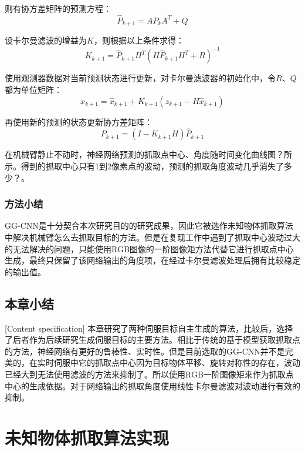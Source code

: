 \documentclass[fontset=fandol,type=bachelor,campus=harbin]{hithesisbook}
\begin{document}
则有协方差矩阵的预测方程：
\begin{equation}
\hat{P}_{k+1}=AP_kA^T+Q
\label{协方差预测}
\end{equation}


设卡尔曼滤波的增益为$K$，则根据以上条件求得：
\begin{equation}
K_{k+1}=\hat{P}_{k+1}H^T\left( H\hat{P}_{k+1}H^T+R \right) ^{-1}
\label{卡尔曼滤波的增益}
\end{equation}


使用观测器数据对当前预测状态进行更新，对卡尔曼滤波器的初始化中，令$R$、$Q$都为单位矩阵：
\begin{equation}
x_{k+1}=\hat{x}_{k+1}+K_{k+1}\left( z_{k+1}-H\hat{x}_{k+1} \right) 
\label{卡尔曼滤波的增益}
\end{equation}


再使用新的预测的状态更新协方差矩阵：
\begin{equation}
P_{k+1}=\left( I-K_{k+1}H \right) \hat{P}_{k+1}
\label{更新协方差矩阵}
\end{equation}


在机械臂静止不动时，神经网络预测的抓取点中心、角度随时间变化曲线{\color{red}图？所示}。得到的抓取中心只有1到2像素点的波动，预测的抓取角度波动几乎消失了{\color{red}多少？}。
\subsection{方法小结}
GG-CNN是十分契合本次研究目的的研究成果，因此它被选作未知物体抓取算法中解决机械臂怎么去抓取目标的方法。但是在复现工作中遇到了抓取中心波动过大的无法解决的问题，只能使用RGB图像的一阶图像矩方法代替它进行抓取点中心生成，最终只保留了该网络输出的角度项，在经过卡尔曼滤波处理后拥有比较稳定的输出值。

\section{本章小结}[Content specification]
本章研究了两种伺服目标自主生成的算法，比较后，选择了后者作为后续研究生成伺服目标的主要方法。相比于传统的基于模型获取抓取点的方法，神经网络有更好的鲁棒性、实时性。但是目前选取的GG-CNN并不是完美的，在实时伺服中它的抓取点中心因为目标物体平移、旋转对称性的存在，波动已经大到无法使用滤波的方法来抑制了。所以使用RGB一阶图像矩来作为抓取点中心的生成依据。对于网络输出的抓取角度使用线性卡尔曼滤波对波动进行有效的抑制。


\chapter[未知物体抓取算法实现]{未知物体抓取算法实现}
\end{document}
